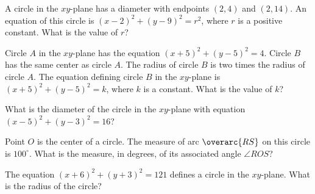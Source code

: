 \vspace{0.75em}


\vspace{4em}

\noindent\markforreview
\vspace{1em}

A circle in the $xy$-plane has a diameter with endpoints $(2, 4)$ and $(2, 14)$. An equation of this circle is $(x - 2)^2 + (y - 9)^2 = r^2$, where $r$ is a positive constant. What is the value of $r$?

\vspace{4em}

\noindent\markforreview
\vspace{1em}

Circle $A$ in the $xy$-plane has the equation $(x + 5)^2 + (y - 5)^2 = 4$. Circle $B$ has the same center as circle $A$. The radius of circle $B$ is two times the radius of circle $A$. The equation defining circle $B$ in the $xy$-plane is $(x + 5)^2 + (y - 5)^2 = k$, where $k$ is a constant. What is the value of $k$?

\vspace{4em}

\noindent\markforreview
\vspace{1em}

What is the diameter of the circle in the $xy$-plane with equation $(x - 5)^2 + (y - 3)^2 = 16$?

\vspace{0.75em}


\vspace{4em}
\noindent\markforreview
\vspace{1em}

Point $O$ is the center of a circle. The measure of arc $\overarc{RS}$ on this circle is $100^\circ$. What is the measure, in degrees, of its associated angle $\angle ROS$?
\newpage
\vspace{2em}

\noindent\markforreview
\vspace{1em}

The equation $(x + 6)^2 + (y + 3)^2 = 121$ defines a circle in the $xy$-plane. What is the radius of the circle?

\vspace{2em}

